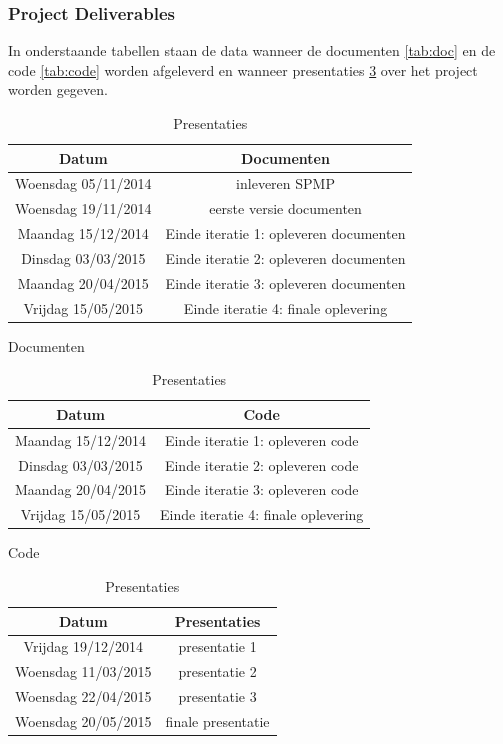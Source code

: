 \subsubsection{Project Deliverables}

In onderstaande tabellen staan de data wanneer de documenten \ref{tab:doc} en de code \ref{tab:code} worden afgeleverd en wanneer presentaties \ref{tab:pres} over het project worden gegeven. 

\begin{table}[h]
\begin{minipage}[b]{0.45\linewidth}
\begin{tabularx}{1.9\textwidth}{c|c}
\hline
\textbf{Datum} & \textbf{Documenten}\\
 \hline
 Woensdag 05/11/2014 & inleveren SPMP \\
 Woensdag 19/11/2014 & eerste versie documenten \\
 Maandag 15/12/2014 & Einde iteratie 1: opleveren documenten \\
 \hline \hline
 Dinsdag 03/03/2015 & Einde iteratie 2: opleveren documenten \\
 Maandag 20/04/2015 & Einde iteratie 3: opleveren documenten \\
 Vrijdag 15/05/2015 & Einde iteratie 4: finale oplevering
\end{tabularx}
\caption{Documenten}
\label{tab:doc}
\end{minipage}

\vspace{0.5cm}

\begin{minipage}[b]{0.45\linewidth}
\begin{tabularx}{1.9\textwidth}{c|c}
\hline
\textbf{Datum} & \textbf{Code}\\
 \hline
 Maandag 15/12/2014 & Einde iteratie 1: opleveren code \\
 \hline \hline
 Dinsdag 03/03/2015 & Einde iteratie 2: opleveren code \\
 Maandag 20/04/2015 & Einde iteratie 3: opleveren code \\
 Vrijdag 15/05/2015 & Einde iteratie 4: finale oplevering
\end{tabularx}
\caption{Code}
\label{tab:code}
\end{minipage}
\vspace{0.5cm}

\begin{minipage}[b]{0.45\linewidth}
\begin{tabularx}{1.9\textwidth}{c|c}
\hline
\textbf{Datum} & \textbf{Presentaties}\\
 \hline
 Vrijdag 19/12/2014 & presentatie 1 \\
 \hline \hline
Woensdag 11/03/2015 & presentatie 2\\
Woensdag 22/04/2015 & presentatie 3\\
Woensdag 20/05/2015 & finale presentatie\\
\end{tabularx}
\caption{Presentaties}
\label{tab:pres}
\end{minipage}
\end{table}
\newpage

